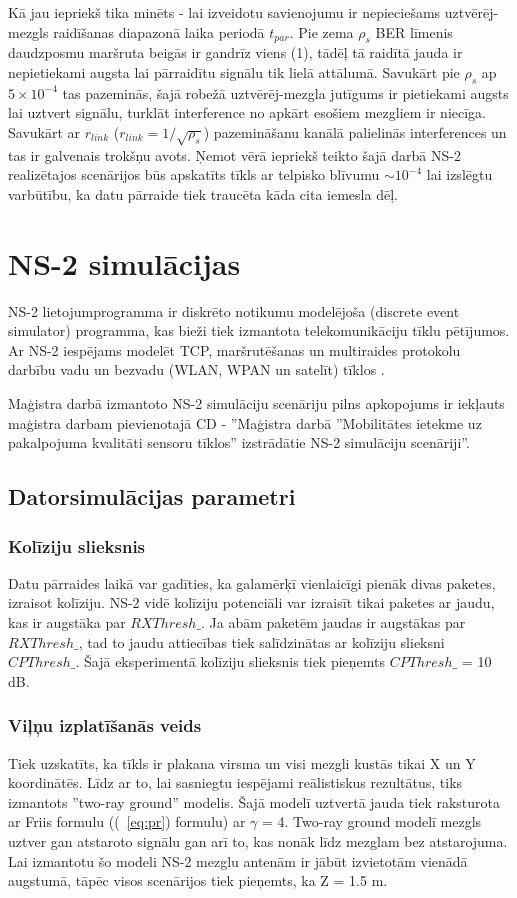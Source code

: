 Kā jau iepriekš tika minēts - lai izveidotu savienojumu ir nepieciešams uztvērēj-mezgls raidīšanas diapazonā laika periodā $t_{par}$. Pie zema $\rho_{s}$ BER līmenis daudzposmu maršruta beigās ir gandrīz viens (1), tādēļ tā raidītā jauda ir nepietiekami augsta lai pārraidītu signālu tik lielā attālumā. Savukārt pie $\rho_{s}$ ap  $5\times10^{-4}$ tas pazeminās, šajā robežā uztvērēj-mezgla jutīgums ir pietiekami augsts lai uztvert signālu, turklāt interference no apkārt esošiem mezgliem ir niecīga. Savukārt ar $r_{link}$ ($r_{link}=1/\sqrt{\rho_{s}}$) pazemināšanu kanālā palielinās interferences un tas ir galvenais trokšņu avots.
Ņemot vērā iepriekš teikto šajā darbā NS-2 realizētajos scenārijos būs apskatīts tīkls ar telpisko blīvumu $\sim10^{-4}$ lai izslēgtu varbūtību, ka datu pārraide tiek traucēta kāda cita iemesla dēļ.


\section{NS-2 simulācijas}
\acf{NS-2} lietojumprogramma ir diskrēto notikumu modelējoša (discrete event simulator) programma, kas bieži tiek izmantota telekomunikāciju tīklu pētījumos. Ar NS-2 iespējams modelēt TCP, maršrutēšanas un multiraides protokolu darbību vadu un bezvadu (WLAN, WPAN un satelīt) tīklos \cite{ns2}.

Maģistra darbā izmantoto NS-2 simulāciju scenāriju pilns apkopojums ir iekļauts maģistra darbam pievienotajā CD - ''Maģistra darbā ''Mobilitātes ietekme uz pakalpojuma kvalitāti sensoru tīklos'' izstrādātie NS-2 simulāciju scenāriji''.


\subsection{Datorsimulācijas parametri}

\subsubsection{Kolīziju slieksnis}
Datu pārraides laikā var gadīties, ka galamērķī vienlaicīgi pienāk divas paketes, izraisot kolīziju. NS-2 vidē kolīziju potenciāli var izraisīt tikai paketes ar jaudu, kas ir augstāka par $RXThresh\_$. Ja abām paketēm jaudas ir augstākas par $RXThresh\_$, tad to jaudu attiecības tiek salīdzinātas ar kolīziju slieksni $CPThresh\_$. Šajā eksperimentā kolīziju slieksnis tiek pieņemts $CPThresh\_$ = 10 dB.

\subsubsection{Viļņu izplatīšanās veids}
Tiek uzskatīts, ka tīkls ir plakana virsma un visi mezgli kustās tikai X un Y koordinātēs. Līdz ar to, lai sasniegtu iespējami reālistiskus rezultātus, tiks izmantots ''two-ray ground'' modelis. Šajā modelī uztvertā jauda tiek raksturota ar Friis formulu (\seename (~\ref{eq:pr}) formulu) ar $\gamma$ = 4.  Two-ray ground modelī mezgls uztver gan atstaroto signālu gan arī to, kas nonāk līdz mezglam bez atstarojuma. Lai izmantotu šo modeli NS-2 mezglu antenām ir jābūt izvietotām vienādā augstumā, tāpēc visos scenārijos tiek pieņemts, ka Z = 1.5 m.

